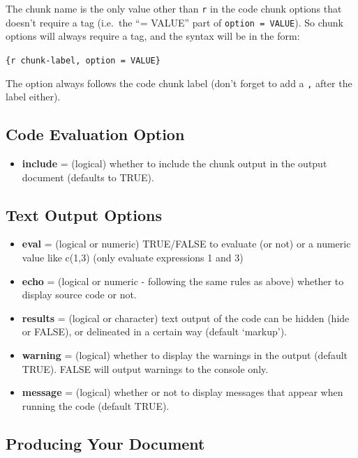 \documentclass[
]{article}
\providecommand{\tightlist}{%
  \setlength{\itemsep}{0pt}\setlength{\parskip}{0pt}}
\begin{document}
The chunk name is the only value other than \texttt{r} in the code chunk
options that doesn't require a tag (i.e.~the ``= VALUE'' part of
\texttt{option\ =\ VALUE}). So chunk options will always require a tag,
and the syntax will be in the form:

\texttt{\{r\ chunk-label,\ option\ =\ VALUE\}}

The option always follows the code chunk label (don't forget to add a
\texttt{,} after the label either).

\hypertarget{code-evaluation-option}{%
\subsection{Code Evaluation Option}\label{code-evaluation-option}}

\begin{itemize}
\tightlist
\item
  \textbf{include} = (logical) whether to include the chunk output in
  the output document (defaults to TRUE).
\end{itemize}

\hypertarget{text-output-options}{%
\subsection{\texorpdfstring{\textbf{Text Output
Options}}{Text Output Options}}\label{text-output-options}}

\begin{itemize}
\item
  \textbf{eval} = (logical or numeric) TRUE/FALSE to evaluate (or not)
  or a numeric value like c(1,3) (only evaluate expressions 1 and 3)
\item
  \textbf{echo} = (logical or numeric - following the same rules as
  above) whether to display source code or not.
\item
  \textbf{results} = (logical or character) text output of the code can
  be hidden (hide or FALSE), or delineated in a certain way (default
  `markup').
\item
  \textbf{warning} = (logical) whether to display the warnings in the
  output (default TRUE). FALSE will output warnings to the console only.
\item
  \textbf{message} = (logical) whether or not to display messages that
  appear when running the code (default TRUE).
\end{itemize}

\hypertarget{producing-your-document}{%
\subsection{Producing Your Document}\label{producing-your-document}}
\end{document}
